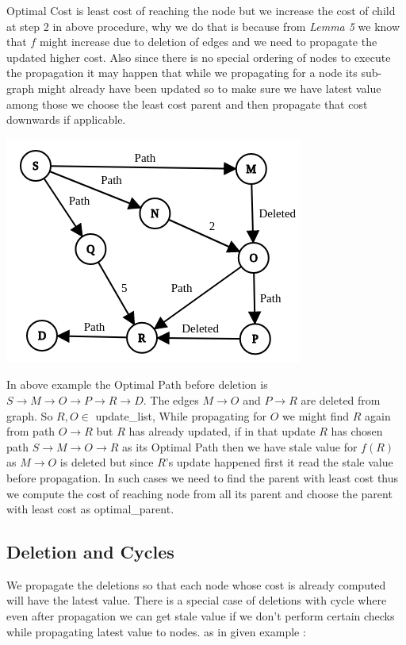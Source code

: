 \documentclass[a4paper]{article}
\begin{document}
Optimal Cost is least cost of reaching the node but we increase the cost of child at step 2 in above procedure, why we do that is because from \textit{Lemma 5} we know that $f$ might increase due to deletion of edges and we need to propagate the updated higher cost. Also since there is no special ordering of nodes to execute the propagation it may happen that while we propagating for a node its sub-graph might already have been updated so to make sure we have latest value among those we choose the least cost parent and then propagate that cost downwards if applicable.\\ \begin{center}
\includegraphics[scale=0.45]{img/Delete1.png}    
\end{center}
In above example the Optimal Path before deletion is $S \rightarrow M \rightarrow O \rightarrow P \rightarrow R \rightarrow D $.
The edges $ M \rightarrow O$ and $P \rightarrow R$ are deleted from graph. So $R,O \in $ update\_list, While propagating for $O$ we might find $R$ again from path $O \rightarrow R$ but $R$ has already updated, if in that update $R$ has chosen path $S \rightarrow M \rightarrow O \rightarrow R$ as its Optimal Path then we have stale value for $f(R)$ as $M \rightarrow O$ is deleted but since $R$'s update happened first it read the stale value before propagation. In such cases we need to find the parent with least cost thus we compute the cost of reaching node from all its parent and choose the parent with least cost as optimal\_parent.

 
\subsection{Deletion and Cycles}
We propagate the deletions so that each node whose cost is already computed will have the latest value. There is a special case of deletions with cycle where even after propagation we can get stale value if we don't perform  certain checks while propagating latest value to nodes. as in given example :
\end{document}
